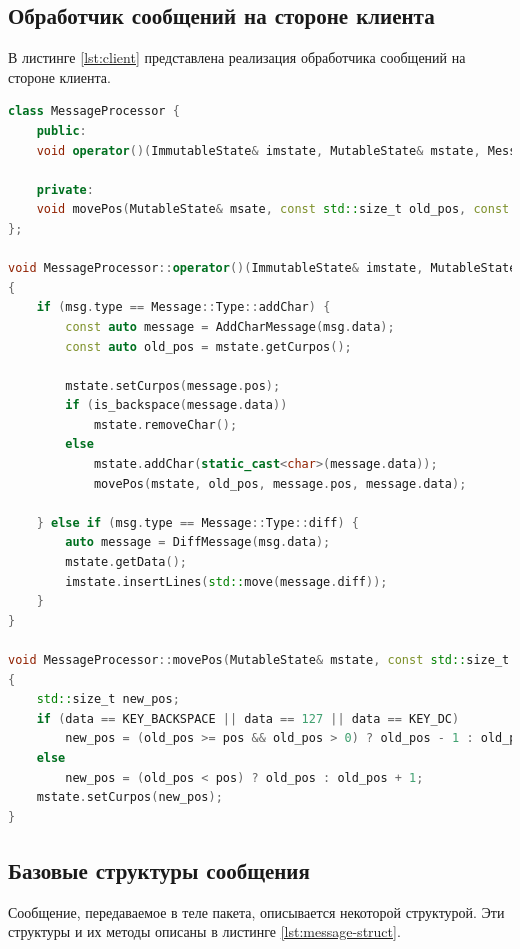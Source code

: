 \subsection{Обработчик сообщений на стороне клиента}

В листинге \ref{lst:client} представлена реализация обработчика сообщений на стороне клиента.\\

\begin{lstlisting}[label=lst:client,caption=Обработчик сообщений (клиент),language=c++]
class MessageProcessor {
	public:
	void operator()(ImmutableState& imstate, MutableState& mstate, Message msg);
	
	private:
	void movePos(MutableState& msate, const std::size_t old_pos, const std::size_t pos, const int data);
};

void MessageProcessor::operator()(ImmutableState& imstate, MutableState& mstate, Message msg)
{
	if (msg.type == Message::Type::addChar) {
		const auto message = AddCharMessage(msg.data);
		const auto old_pos = mstate.getCurpos();
		
		mstate.setCurpos(message.pos);
		if (is_backspace(message.data))
			mstate.removeChar();
		else
			mstate.addChar(static_cast<char>(message.data));
			movePos(mstate, old_pos, message.pos, message.data);
		
	} else if (msg.type == Message::Type::diff) {
		auto message = DiffMessage(msg.data);
		mstate.getData();
		imstate.insertLines(std::move(message.diff));
	}
}

void MessageProcessor::movePos(MutableState& mstate, const std::size_t old_pos, const std::size_t pos, const int data)
{
	std::size_t new_pos;
	if (data == KEY_BACKSPACE || data == 127 || data == KEY_DC)
		new_pos = (old_pos >= pos && old_pos > 0) ? old_pos - 1 : old_pos;
	else
		new_pos = (old_pos < pos) ? old_pos : old_pos + 1;
	mstate.setCurpos(new_pos);
}
\end{lstlisting}

\subsection{Базовые структуры сообщения}

Сообщение, передаваемое в теле пакета, описывается некоторой структурой. Эти структуры и их методы описаны в листинге \ref{lst:message-struct}.\\ 

